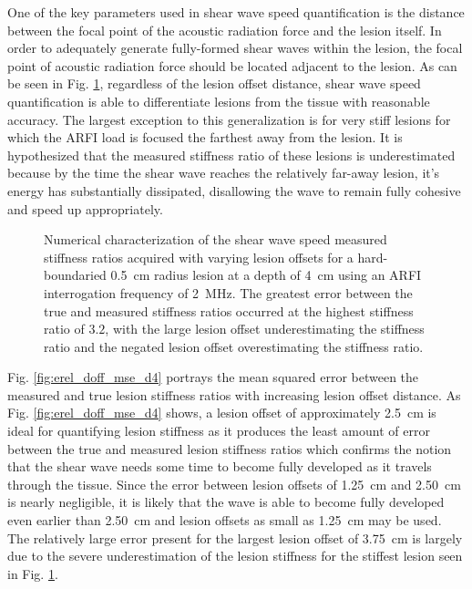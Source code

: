 			One of the key parameters used in shear wave speed quantification is the distance between the focal point of the acoustic radiation force and the lesion itself. In order to adequately generate fully-formed shear waves within the lesion, the focal point of acoustic radiation force should be located adjacent to the lesion. As can be seen in Fig. \ref{fig:erel_doff_d4}, regardless of the lesion offset distance, shear wave speed quantification is able to differentiate lesions from the tissue with reasonable accuracy. The largest exception to this generalization is for very stiff lesions for which the ARFI load is focused the farthest away from the lesion. It is hypothesized that the measured stiffness ratio of these lesions is underestimated because by the time the shear wave reaches the relatively far-away lesion, it's energy has substantially dissipated, disallowing the wave to remain fully cohesive and speed up appropriately.

			\begin{figure}[!htb]
				\centering
				\caption[Numerical characterization of shear wave speed measured stiffness ratio with changing lesion offsets]{Numerical characterization of the shear wave speed measured stiffness ratios acquired with varying lesion offsets for a hard-boundaried \SI{0.5}{cm} radius lesion at a depth of \SI{4}{\cm} using an ARFI interrogation frequency of \SI{2}{\MHz}. The greatest error between the true and measured stiffness ratios occurred at the highest stiffness ratio of $3.2$, with the large lesion offset underestimating the stiffness ratio and the negated lesion offset overestimating the stiffness ratio.}
				\label{fig:erel_doff_d4}
			\end{figure}

			Fig. \ref{fig:erel_doff_mse_d4} portrays the mean squared error between the measured and true lesion stiffness ratios with increasing lesion offset distance. As Fig. \ref{fig:erel_doff_mse_d4} shows, a lesion offset of approximately \SI{2.5}{\cm} is ideal for quantifying lesion stiffness as it produces the least amount of error between the true and measured lesion stiffness ratios which confirms the notion that the shear wave needs some time to become fully developed as it travels through the tissue. Since the error between lesion offsets of \SI{1.25}{\cm} and \SI{2.50}{\cm} is nearly negligible, it is likely that the wave is able to become fully developed even earlier than \SI{2.50}{\cm} and lesion offsets as small as \SI{1.25}{\cm} may be used. The relatively large error present for the largest lesion offset of \SI{3.75}{\cm} is largely due to the severe underestimation of the lesion stiffness for the stiffest lesion seen in Fig. \ref{fig:erel_doff_d4}.

